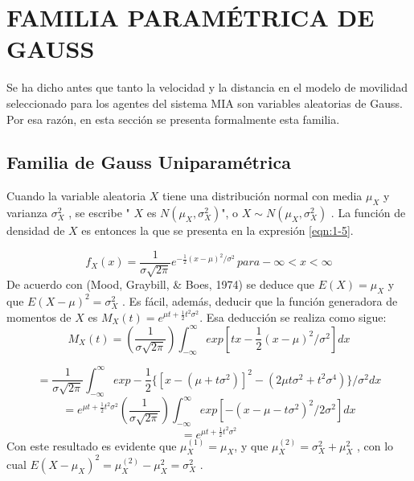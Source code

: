 \section{FAMILIA PARAMÉTRICA DE GAUSS}\label{sec:gaussParamFam}
Se ha dicho antes que tanto la velocidad y la distancia en el modelo de movilidad seleccionado para los agentes del sistema MIA son variables aleatorias de Gauss.  Por esa razón, en esta sección se presenta formalmente esta familia.
\subsection{Familia de Gauss Uniparamétrica}
Cuando la variable aleatoria $X$   tiene una distribución normal con media $\mu_{X}$  y varianza $\sigma^{2}_X$ , se escribe  " $X$  es $N(\mu_{X},\sigma^{2}_X)$", o $X \sim N(\mu_{X},\sigma^{2}_X)$ . La función de densidad de  $X$ es entonces  la que se presenta en la expresión  \ref{eqn:1-5}.

\begin{equation}
f_X (x)=\frac{1}{{\sigma\sqrt{2\pi}}}e^{-\frac{1}{2} (x-\mu)^2/\sigma^2\ } para -\infty<x<\infty
\label{eqn:1-5}
\end{equation}
De acuerdo con (Mood, Graybill, \& Boes, 1974) se deduce que  $E(X)=\mu_X$  y  que $E(X-\mu)^{2}=\sigma^{2}_X$  . Es fácil, además, deducir que la función generadora de momentos de $X$ es $M_X(t)=e^{\mu t+\frac{1}{2}t^{2}\sigma^{2}}$. Esa deducción se realiza como sigue:\\
\begin{equation*}
M_X(t)=(\frac{1}{\sigma \sqrt{2\pi}})\int^{\infty}_{-\infty}exp[tx-\frac{1}{2}(x-\mu)^{2}/\sigma^{2}]dx 
\end{equation*}

\begin{equation*}
    =\frac{1}{\sigma \sqrt{2\pi}}\int^{\infty}_{-\infty}exp-\frac{1}{2}\{ [x-(\mu+t\sigma^{2})]^{2}-(2\mu t\sigma^{2}+t^{2}\sigma^{4})\}/\sigma^{2}dx
\end{equation*}
\begin{equation*}
    =e^{\mu t+\frac{1}{2}t^{2}\sigma^{2}}(\frac{1}{\sigma \sqrt{2\pi}})\int^{\infty}_{-\infty}exp[-(x-\mu-t\sigma^2)^2/2\sigma^2]dx
\end{equation*}
\begin{equation*}
    =e^{\mu t+\frac{1}{2}t^{2}\sigma^{2}}
\end{equation*}
Con este resultado es evidente que $\mu_X^{(1)}=\mu_X$, y que $\mu_X^{(2)}=\sigma_X^{2}+\mu_X^{2}$ , con lo cual $E(X-\mu_X)^2=\mu_X^{(2)}-\mu_X^2=\sigma_X^2$ .

